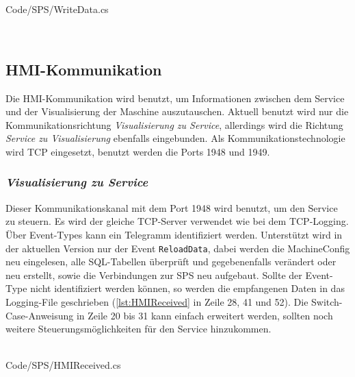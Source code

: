 \ \\
\begin{minipage}{\textwidth}
\ \\
 {Code/SPS/WriteData.cs}
\ \\
\end{minipage}
\ \\
\subsection{HMI-Kommunikation}
Die HMI-Kommunikation wird benutzt, um Informationen zwischen dem Service und der Visualisierung der Maschine auszutauschen. Aktuell benutzt wird nur die Kommunikationsrichtung \textit{Visualisierung zu Service}, allerdings wird die Richtung \textit{Service zu Visualisierung} ebenfalls eingebunden. Als Kommunikationstechnologie wird TCP eingesetzt, benutzt werden die Ports 1948 und 1949.
\subsubsection{\textit{Visualisierung zu Service}}
Dieser Kommunikationskanal mit dem Port 1948 wird benutzt, um den Service zu steuern. Es wird der gleiche TCP-Server verwendet wie bei dem TCP-Logging. Über Event-Types kann ein Telegramm identifiziert werden. Unterstützt wird in der aktuellen Version nur der Event \texttt{ReloadData}, dabei werden die MachineConfig neu eingelesen, alle SQL-Tabellen überprüft und gegebenenfalls verändert oder neu erstellt, sowie die Verbindungen zur SPS neu aufgebaut. Sollte der Event-Type nicht identifiziert werden können, so werden die empfangenen Daten in das Logging-File geschrieben (\autoref{lst:HMIReceived} in Zeile 28, 41 und 52). Die Switch-Case-Anweisung in Zeile 20 bis 31 kann einfach erweitert werden, sollten noch weitere Steuerungsmöglichkeiten für den Service hinzukommen. 
\ \\
\begin{minipage}{\textwidth}
\ \\
 {Code/SPS/HMIReceived.cs}
\ \\
\end{minipage}
\ \\
\newpage
